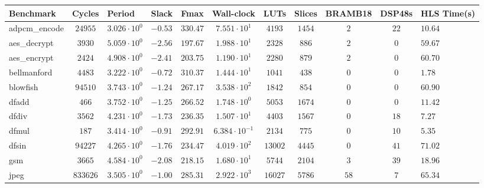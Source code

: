 \begin{tabular}{|l|c|HHc|c|c|c|c|cH|}
\hline
Benchmark     & Cycles       & Period                 & Slack     & Fmax       & Wall-clock              & LUTs      & Slices    & BRAMB18 & DSP48s  & HLS Time(s) \\
\hline
adpcm\_encode & $ 24955    $ & $ 3.026 \cdot 10^{0} $ & $ -0.53 $ & $ 330.47 $ & $ 7.551 \cdot 10^{1}  $ & $ 4193  $ & $ 1454  $ & $ 2   $ & $ 22  $ & $ 10.64   $ \\
aes\_decrypt  & $ 3930     $ & $ 5.059 \cdot 10^{0} $ & $ -2.56 $ & $ 197.67 $ & $ 1.988 \cdot 10^{1}  $ & $ 2328  $ & $ 886   $ & $ 2   $ & $ 0   $ & $ 59.67   $ \\
aes\_encrypt  & $ 2424     $ & $ 4.908 \cdot 10^{0} $ & $ -2.41 $ & $ 203.75 $ & $ 1.190 \cdot 10^{1}  $ & $ 2280  $ & $ 879   $ & $ 2   $ & $ 0   $ & $ 60.70   $ \\
bellmanford   & $ 4483     $ & $ 3.222 \cdot 10^{0} $ & $ -0.72 $ & $ 310.37 $ & $ 1.444 \cdot 10^{1}  $ & $ 1041  $ & $ 438   $ & $ 0   $ & $ 0   $ & $ 1.78    $ \\
blowfish      & $ 94510    $ & $ 3.743 \cdot 10^{0} $ & $ -1.24 $ & $ 267.17 $ & $ 3.538 \cdot 10^{2}  $ & $ 1842  $ & $ 854   $ & $ 0   $ & $ 0   $ & $ 60.90   $ \\
dfadd         & $ 466      $ & $ 3.752 \cdot 10^{0} $ & $ -1.25 $ & $ 266.52 $ & $ 1.748 \cdot 10^{0}  $ & $ 5053  $ & $ 1674  $ & $ 0   $ & $ 0   $ & $ 11.42   $ \\
dfdiv         & $ 3562     $ & $ 4.231 \cdot 10^{0} $ & $ -1.73 $ & $ 236.35 $ & $ 1.507 \cdot 10^{1}  $ & $ 4403  $ & $ 1567  $ & $ 0   $ & $ 18  $ & $ 7.27    $ \\
dfmul         & $ 187      $ & $ 3.414 \cdot 10^{0} $ & $ -0.91 $ & $ 292.91 $ & $ 6.384 \cdot 10^{-1} $ & $ 2134  $ & $ 775   $ & $ 0   $ & $ 10  $ & $ 5.35    $ \\
dfsin         & $ 94227    $ & $ 4.265 \cdot 10^{0} $ & $ -1.76 $ & $ 234.47 $ & $ 4.019 \cdot 10^{2}  $ & $ 13002 $ & $ 4445  $ & $ 0   $ & $ 41  $ & $ 71.02   $ \\
gsm           & $ 3665     $ & $ 4.584 \cdot 10^{0} $ & $ -2.08 $ & $ 218.15 $ & $ 1.680 \cdot 10^{1}  $ & $ 5744  $ & $ 2104  $ & $ 3   $ & $ 39  $ & $ 18.96   $ \\
jpeg          & $ 833626   $ & $ 3.505 \cdot 10^{0} $ & $ -1.00 $ & $ 285.31 $ & $ 2.922 \cdot 10^{3}  $ & $ 16027 $ & $ 5786  $ & $ 58  $ & $ 7   $ & $ 65.34   $ \\

\end{tabular}
